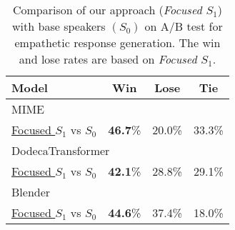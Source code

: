 \documentclass[11pt]{article}
\begin{document}
{\renewcommand{\arraystretch}{1.1}\begin{table}[t] \begin{center}
    \small
    \setlength{\tabcolsep}{10.6pt}
    \begin{tabular}{lccc}
        \toprule
        \hspace{-2mm}Model                                 & Win             & Lose          & Tie    \\
        \midrule
        \multicolumn{4}{l}{\hspace{-2mm}MIME \citep{Majumder:2020:EMNLP}} \\
        \addlinespace[0.1cm]
        \underline{Focused $S_1$} vs $S_0$     & \textbf{46.7}\%            & 20.0\%         & 33.3\%                     \\
        \midrule
        \multicolumn{4}{l}{\hspace{-2mm}DodecaTransformer \citep{Shuster:2020:ACL}} \\
        \addlinespace[0.1cm]
        \underline{Focused $S_1$} vs $S_0$     & \textbf{42.1}\%            & 28.8\%         & 29.1\%                     \\
        \midrule
        \multicolumn{4}{l}{\hspace{-2mm}Blender \citep{Roller:2021:EACL}} \\
        \addlinespace[0.1cm]
        \underline{Focused $S_1$} vs $S_0$    & \textbf{44.6}\%            & 37.4\%          & 18.0\%                     \\
        \bottomrule
    \end{tabular}
    \vspace{-4pt}
    \caption{
        Comparison of our approach (\textit{Focused $S_1$}) with base speakers $(S_0)$ on A/B test for empathetic response generation.
        The win and lose rates are based on \textit{Focused $S_1$}.
    }
    \vspace{-8pt}
    \label{tab:amt_ab_test}
\end{center}\end{table}}
\end{document}
